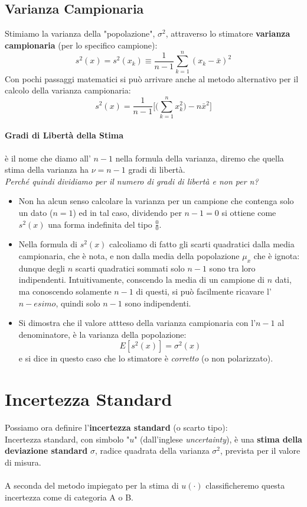 \documentclass[a4paper,11pt]{report}
\begin{document}
\subsection{Varianza Campionaria}
Stimiamo la varianza della "popolazione", $\sigma^2$, attraverso lo stimatore \textbf{varianza campionaria} (per lo specifico campione):
$$
  s^2(x) = s^2(x_k) \equiv \frac{1}{n-1}\sum^{n}_{k=1}(x_k-\bar{x})^2
$$
Con pochi passaggi matematici si può arrivare anche al metodo alternativo per il calcolo della varianza campionaria:
$$
  s^2(x) = \frac{1}{n-1}\Bigg[\Bigg(\sum^{n}_{k=1}x^2_k\Bigg)-n\bar{x}^2\Bigg]
$$
\paragraph{Gradi di Libertà della Stima} è il nome che diamo all' $n-1$ nella formula della varianza, diremo che quella stima della varianza ha $\nu = n-1$ gradi di libertà.\\

\textit{Perché quindi dividiamo per il numero di gradi di libertà e non per n?}
\begin{itemize}
  \item Non ha alcun senso calcolare la varianza per un campione che contenga solo un dato ($n=1$) ed in tal caso, dividendo per $n-1 = 0$ si ottiene come $s^2(x)$ una forma indefinita del tipo $\frac{0}{0}$.
  \item Nella formula di $s^2(x)$ calcoliamo di fatto gli scarti quadratici dalla media campionaria, che è nota, e non dalla media della popolazione $\mu_x$ che è ignota: dunque degli $n$ scarti quadratici sommati solo $n-1$ sono tra loro indipendenti. Intuitivamente, conscendo la media di un campione di $n$ dati, ma conoscendo solamente $n-1$ di questi, si può facilmente ricavare l'$n-esimo$, quindi solo $n-1$ sono indipendenti.
  \item Si dimostra che il valore attteso della varianza campionaria con l'$n-1$ al denominatore, è la varianza della popolazione:
  $$
    E[s^2(x)] = \sigma^2(x)
  $$
  e si dice in questo caso che lo stimatore è \textit{corretto} (o non polarizzato).
\end{itemize}
\section{Incertezza Standard}
Possiamo ora definire l'\textbf{incertezza standard} (o scarto tipo):\\

Incertezza standard, con simbolo "$u$" (dall'inglese \textit{uncertainty}), è una \textbf{stima della deviazione standard} $\sigma$, radice quadrata della varianza $\sigma^2$, prevista per il valore di misura.\\ \\
A seconda del metodo impiegato per la stima di $u(\cdotp)$ classificheremo questa incertezza come di categoria A o B.
\end{document}
